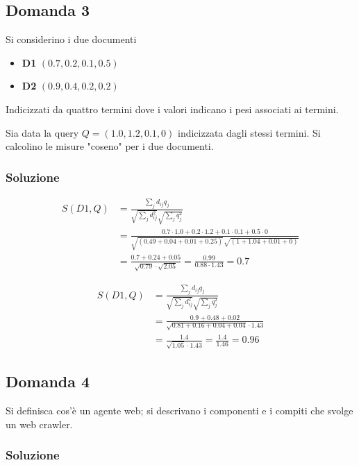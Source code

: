 \subsection{Domanda 3}

Si considerino i due documenti

\begin{itemize}
	\item \textbf{D1} $(0.7, 0.2, 0.1, 0.5)$
	\item \textbf{D2} $(0.9, 0.4, 0.2, 0.2)$
\end{itemize}

Indicizzati da quattro termini dove i valori indicano i pesi associati ai termini.

Sia data la query $Q = (1.0, 1.2, 0.1, 0)$ indicizzata dagli stessi termini. Si calcolino le misure "coseno" per i due documenti.

\subsubsection{Soluzione}

\begin{align*}
S(D1, Q) &= \frac{
	\sum_j d_{ij}q_j
}{
	\sqrt{\sum_j d_{ij}^2}\sqrt{\sum_j q_{j}^2}
} \\
&= \frac{
	0.7\cdot 1.0 + 0.2 \cdot 1.2 + 0.1 \cdot 0.1 + 0.5 \cdot 0
}{
 \sqrt{(0.49 + 0.04 + 0.01 + 0.25)} \sqrt{(1 + 1.04 + 0.01 + 0)}
}\\
&= \frac{0.7 + 0.24 + 0.05}{\sqrt{0.79} \cdot \sqrt{2.05}} = \frac{0.99}{0.88 \cdot 1.43} = 0.7
\end{align*}

\begin{align*}
S(D1, Q) &= \frac{
	\sum_j d_{ij}q_j
}{
	\sqrt{\sum_j d_{ij}^2}\sqrt{\sum_j q_{j}^2}
} \\
&= \frac{
	0.9 + 0.48+ 0.02
}{
	\sqrt{0.81 + 0.16 + 0.04 + 0.04}\cdot 1.43
}\\
&= \frac{
	1.4
}{
	\sqrt{1.05}\cdot 1.43
} = \frac{1.4}{1.46} = 0.96
\end{align*}

\subsection{Domanda 4}

Si definisca cos'è un agente web; si descrivano i componenti e i compiti che svolge un web crawler.

\subsubsection{Soluzione}

